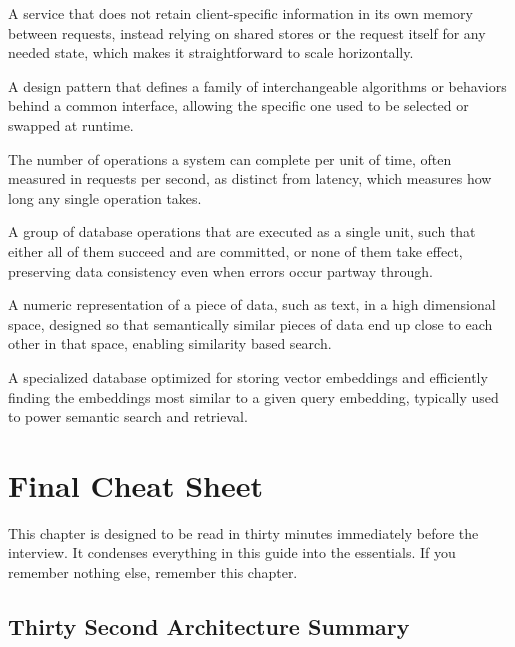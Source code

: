 \documentclass[11pt,a4paper]{report}
\begin{document}
\begin{description}[leftmargin=*,style=nextline]
\item[Stateless Service] A service that does not retain client-specific information in its own memory between requests, instead relying on shared stores or the request itself for any needed state, which makes it straightforward to scale horizontally.

\item[Strategy Pattern] A design pattern that defines a family of interchangeable algorithms or behaviors behind a common interface, allowing the specific one used to be selected or swapped at runtime.

\item[Throughput] The number of operations a system can complete per unit of time, often measured in requests per second, as distinct from latency, which measures how long any single operation takes.

\item[Transaction (Database)] A group of database operations that are executed as a single unit, such that either all of them succeed and are committed, or none of them take effect, preserving data consistency even when errors occur partway through.

\item[Vector Embedding] A numeric representation of a piece of data, such as text, in a high dimensional space, designed so that semantically similar pieces of data end up close to each other in that space, enabling similarity based search.

\item[Vector Store] A specialized database optimized for storing vector embeddings and efficiently finding the embeddings most similar to a given query embedding, typically used to power semantic search and retrieval.
\end{description}

\chapter{Final Cheat Sheet}

This chapter is designed to be read in thirty minutes immediately before the interview. It condenses everything in this guide into the essentials. If you remember nothing else, remember this chapter.

\section{Thirty Second Architecture Summary}
\end{document}
